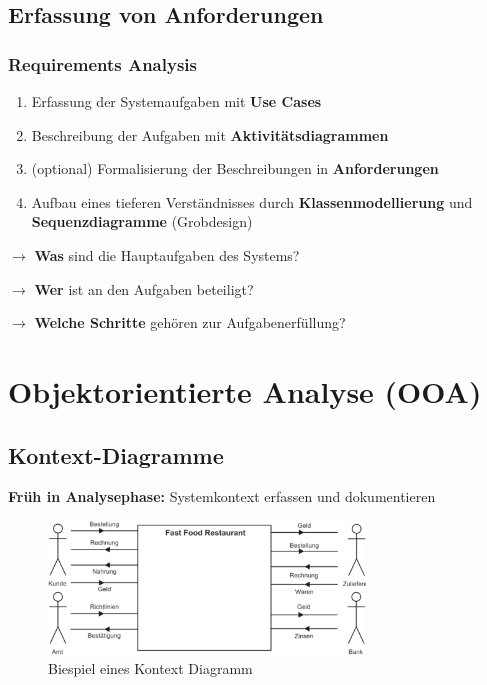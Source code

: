 \documentclass[11pt, a4paper]{article}
\begin{document}
\subsection{Erfassung von Anforderungen}

\subsubsection{Requirements Analysis}

\begin{enumerate}
    \item Erfassung der Systemaufgaben mit \textbf{Use Cases}
    \item Beschreibung der Aufgaben mit \textbf{Aktivitätsdiagrammen}
    \item (optional) Formalisierung der Beschreibungen in \textbf{Anforderungen}
    \item Aufbau eines tieferen Verständnisses durch \textbf{Klassenmodellierung} und \textbf{Sequenzdiagramme} (Grobdesign)
\end{enumerate}

\vspace{1em}

$ \rightarrow $ \textbf{Was} sind die Hauptaufgaben des Systems?

$ \rightarrow $ \textbf{Wer} ist an den Aufgaben beteiligt?

$ \rightarrow $ \textbf{Welche Schritte} gehören zur Aufgabenerfüllung?

\newpage



\newpage


\section{Objektorientierte Analyse (OOA)} %


\subsection{Kontext-Diagramme}

\textbf{Früh in Analysephase:} Systemkontext erfassen und dokumentieren

\begin{figure}[h]
    \centering
    \includegraphics[width=0.75\textwidth]{KontextDiagramm-00.png}
    \caption{Biespiel eines Kontext Diagramm}
    \label{fig:KontextDiagramm-00}
\end{figure}
\end{document}
